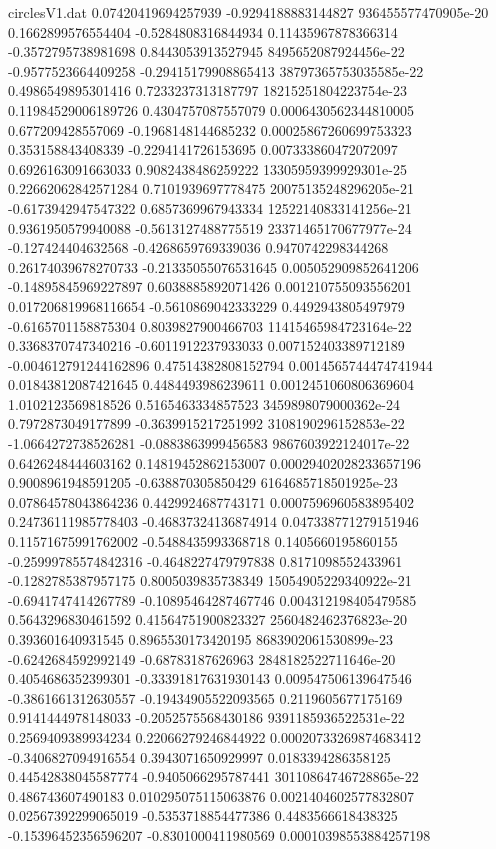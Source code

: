 \begin{filecontents}{circlesV1.dat}
0.07420419694257939	-0.9294188883144827	936455577470905e-20
0.1662899576554404	-0.5284808316844934	0.11435967878366314
-0.3572795738981698	0.8443053913527945	8495652087924456e-22
-0.9577523664409258	-0.29415179908865413	38797365753035585e-22
0.4986549895301416	0.7233237313187797	18215251804223754e-23
0.11984529006189726	0.4304757087557079	0.0006430562344810005
0.677209428557069	-0.1968148144685232	0.00025867260699753323
0.353158843408339	-0.2294141726153695	0.007333860472072097
0.6926163091663033	0.9082438486259222	13305959399929301e-25
0.22662062842571284	0.7101939697778475	20075135248296205e-21
-0.6173942947547322	0.6857369967943334	12522140833141256e-21
0.9361950579940088	-0.5613127488775519	23371465170677977e-24
-0.127424404632568	-0.4268659769339036	0.9470742298344268
0.26174039678270733	-0.21335055076531645	0.005052909852641206
-0.14895845969227897	0.6038885892071426	0.001210755093556201
0.017206819968116654	-0.5610869042333229	0.4492943805497979
-0.6165701158875304	0.8039827900466703	11415465984723164e-22
0.3368370747340216	-0.6011912237933033	0.007152403389712189
-0.004612791244162896	0.47514382808152794	0.0014565744474741944
0.01843812087421645	0.4484493986239611	0.0012451060806369604
1.0102123569818526	0.5165463334857523	3459898079000362e-24
0.7972873049177899	-0.3639915217251992	3108190296152853e-22
-1.0664272738526281	-0.0883863999456583	9867603922124017e-22
0.6426248444603162	0.14819452862153007	0.00029402028233657196
0.9008961948591205	-0.638870305850429	6164685718501925e-23
0.07864578043864236	0.4429924687743171	0.0007596960583895402
0.24736111985778403	-0.46837324136874914	0.047338771279151946
0.11571675991762002	-0.5488435993368718	0.1405660195860155
-0.25999785574842316	-0.4648227479797838	0.8171098552433961
-0.1282785387957175	0.8005039835738349	15054905229340922e-21
-0.6941747414267789	-0.10895464287467746	0.004312198405479585
0.5643296830461592	0.41564751900823327	2560482462376823e-20
0.393601640931545	0.8965530173420195	8683902061530899e-23
-0.6242684592992149	-0.68783187626963	2848182522711646e-20
0.4054686352399301	-0.33391817631930143	0.009547506139647546
-0.3861661312630557	-0.19434905522093565	0.2119605677175169
0.9141444978148033	-0.2052575568430186	9391185936522531e-22
0.2569409389934234	0.22066279246844922	0.00020733269874683412
-0.3406827094916554	0.3943071650929997	0.0183394286358125
0.44542838045587774	-0.9405066295787441	30110864746728865e-22
0.486743607490183	0.010295075115063876	0.0021404602577832807
0.02567392299065019	-0.5353718854477386	0.4483566618438325
-0.15396452356596207	-0.8301000411980569	0.00010398553884257198

\end{filecontents}
